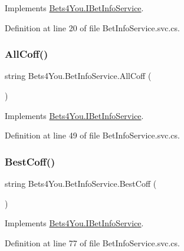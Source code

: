 Implements \mbox{\hyperlink{interface_bets4_you_1_1_i_bet_info_service_ad0dd9958108c51bd4fe08c1fa9c47a53}{Bets4\+You.\+I\+Bet\+Info\+Service}}.



Definition at line 20 of file Bet\+Info\+Service.\+svc.\+cs.

\mbox{\label{class_bets4_you_1_1_bet_info_service_a3df2201fec0a81c97b362f3e7cb90577}} 
\subsubsection{\texorpdfstring{AllCoff()}{AllCoff()}}
{\footnotesize\ttfamily string Bets4\+You.\+Bet\+Info\+Service.\+All\+Coff (\begin{DoxyParamCaption}{ }\end{DoxyParamCaption})}



Implements \mbox{\hyperlink{interface_bets4_you_1_1_i_bet_info_service_a3b8eab8c72aedf36c5b44c35bf51df4e}{Bets4\+You.\+I\+Bet\+Info\+Service}}.



Definition at line 49 of file Bet\+Info\+Service.\+svc.\+cs.

\mbox{\label{class_bets4_you_1_1_bet_info_service_aa61e540cfbd81810e011755534d6db05}} 
\subsubsection{\texorpdfstring{BestCoff()}{BestCoff()}}
{\footnotesize\ttfamily string Bets4\+You.\+Bet\+Info\+Service.\+Best\+Coff (\begin{DoxyParamCaption}{ }\end{DoxyParamCaption})}



Implements \mbox{\hyperlink{interface_bets4_you_1_1_i_bet_info_service_a10d69b8875de331135a893a8bb3c057e}{Bets4\+You.\+I\+Bet\+Info\+Service}}.



Definition at line 77 of file Bet\+Info\+Service.\+svc.\+cs.

